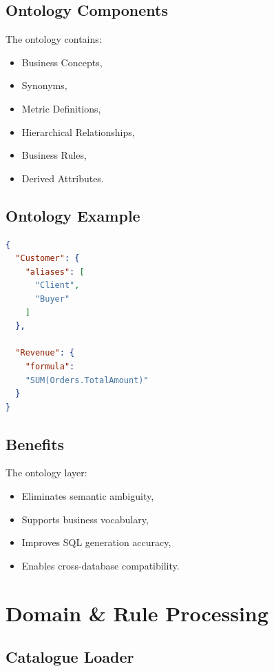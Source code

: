 \documentclass[11pt,a4paper]{article}
\begin{document}
\subsection{Ontology Components}

The ontology contains:
\begin{itemize}
    \item Business Concepts,
    \item Synonyms,
    \item Metric Definitions,
    \item Hierarchical Relationships,
    \item Business Rules,
    \item Derived Attributes.
\end{itemize}

\subsection{Ontology Example}

\begin{lstlisting}[language=json]
{
  "Customer": {
    "aliases": [
      "Client",
      "Buyer"
    ]
  },

  "Revenue": {
    "formula":
    "SUM(Orders.TotalAmount)"
  }
}
\end{lstlisting}

\subsection{Benefits}

The ontology layer:
\begin{itemize}
    \item Eliminates semantic ambiguity,
    \item Supports business vocabulary,
    \item Improves SQL generation accuracy,
    \item Enables cross-database compatibility.
\end{itemize}

\section{Domain \& Rule Processing}

\subsection{Catalogue Loader}
\end{document}
